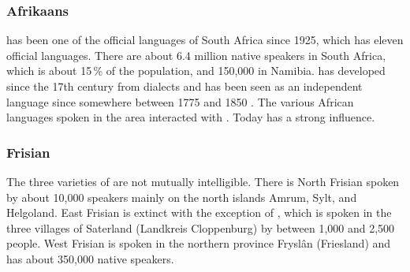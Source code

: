 
\subsubsection{Afrikaans}

 has been one of the official languages of South Africa since 1925, which has eleven official languages.
There are about 6.4 million native speakers in South Africa, which is about 15\,\% of the population,
and 150,000 in Namibia.  has developed since the 17th century from  dialects and has
been seen as an independent language since somewhere between 1775 and 1850 
\citep[]{denBesten2012a-u}.
The various African languages spoken in the area interacted with .
Today  has a strong influence.



\subsubsection{Frisian}

The three varieties of  are not mutually intelligible. There is North Frisian spoken by
about 10,000 speakers mainly on the north  islands Amrum, Sylt, and Helgoland. East Frisian
is extinct with the exception of , which is spoken in the three villages of Saterland
(Landkreis Cloppenburg) by between 1,000 and 2,500 people.
West Frisian is spoken in the northern  province Fryslân (Friesland) and has about 350,000
native speakers.



